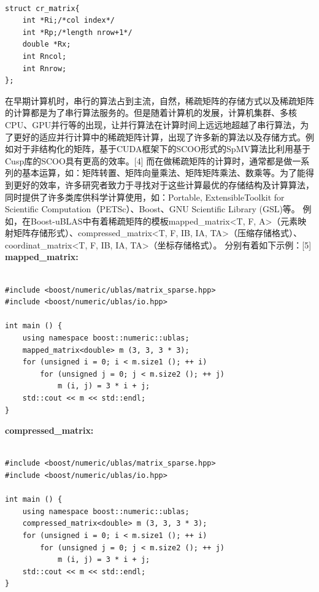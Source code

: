 \documentclass{article}
\begin{document}
\begin{lstlisting}

struct cr_matrix{ 
	int *Ri;/*col index*/ 
	int *Rp;/*length nrow+1*/ 
	double *Rx; 
	int Rncol;
	int Rnrow;
};

\end{lstlisting}


在早期计算机时，串行的算法占到主流，自然，稀疏矩阵的存储方式以及稀疏矩阵的计算都是为了串行算法服务的。但是随着计算机的发展，计算机集群、多核CPU、GPU并行等的出现，让并行算法在计算时间上远远地超越了串行算法，为了更好的适应并行计算中的稀疏矩阵计算，出现了许多新的算法以及存储方式。例如对于非结构化的矩阵，基于CUDA框架下的SCOO形式的SpMV算法比利用基于Cusp库的SCOO具有更高的效率。[4]
\newline
而在做稀疏矩阵的计算时，通常都是做一系列的基本运算，如：矩阵转置、矩阵向量乘法、矩阵矩阵乘法、数乘等。为了能得到更好的效率，许多研究者致力于寻找对于这些计算最优的存储结构及计算算法，同时提供了许多类库供科学计算使用，如：Portable, ExtensibleToolkit for Scientific Computation（PETSc）、Boost、GNU Scientific Library (GSL)等。\newline
例如，在Boost-uBLAS中有着稀疏矩阵的模板mapped\_matrix<T, F, A>（元素映射矩阵存储形式）、compressed\_matrix<T, F, IB, IA, TA>（压缩存储格式）、coordinat\_matrix<T, F, IB, IA, TA>（坐标存储格式）。
分别有着如下示例：[5]\newline
\textbf{mapped\_matrix:}
\begin{lstlisting}

#include <boost/numeric/ublas/matrix_sparse.hpp>
#include <boost/numeric/ublas/io.hpp>

int main () {
    using namespace boost::numeric::ublas;
    mapped_matrix<double> m (3, 3, 3 * 3);
    for (unsigned i = 0; i < m.size1 (); ++ i)
        for (unsigned j = 0; j < m.size2 (); ++ j)
            m (i, j) = 3 * i + j;
    std::cout << m << std::endl;
}

\end{lstlisting}

\textbf{compressed\_matrix:}
\begin{lstlisting}

#include <boost/numeric/ublas/matrix_sparse.hpp>
#include <boost/numeric/ublas/io.hpp>

int main () {
    using namespace boost::numeric::ublas;
    compressed_matrix<double> m (3, 3, 3 * 3);
    for (unsigned i = 0; i < m.size1 (); ++ i)
        for (unsigned j = 0; j < m.size2 (); ++ j)
            m (i, j) = 3 * i + j;
    std::cout << m << std::endl;
}

\end{lstlisting}
\end{document}
